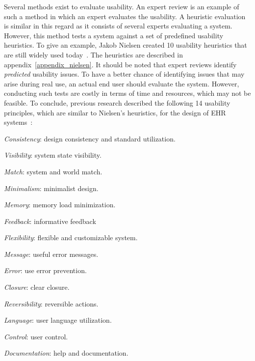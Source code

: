     Several methods exist to evaluate usability. An expert review is an example of such a method in which an expert evaluates the usability. A heuristic evaluation is similar in this regard as it consists of several experts evaluating a system. However, this method tests a system against a set of predefined usability heuristics. To give an example, Jakob Nielsen created 10 usability heuristics that are still widely used today~\cite{Nielsen1993}. The heuristics are described in appendix~\ref{appendix_nielsen}. It should be noted that expert reviews identify \emph{predicted} usability issues. To have a better chance of identifying issues that may arise during real use, an actual end user should evaluate the system. However, conducting such tests are costly in terms of time and resources, which may not be feasible. To conclude, previous research described the following 14 usability principles, which are similar to Nielsen's heuristics, for the design of EHR systems~\cite{Middleton2013}:
    \begin{multicols}{2}
        \begin{myenumerate}
            \item \emph{Consistency}: design consistency and standard utilization.
            \item \emph{Visibility}: system state visibility.
            \item \emph{Match}: system and world match.
            \item \emph{Minimalism}: minimalist design.
            \item \emph{Memory}: memory load minimization.
            \item \emph{Feedback}: informative feedback
            \item \emph{Flexibility}: flexible and customizable system.
            \item \emph{Message}: useful error messages.
            \item \emph{Error}: use error prevention.
            \item \emph{Closure}: clear closure.
            \item \emph{Reversibility}: reversible actions.
            \item \emph{Language}: user language utilization.
            \item \emph{Control}: user control.
            \item \emph{Documentation}: help and documentation.
        \end{myenumerate}
    \end{multicols}

